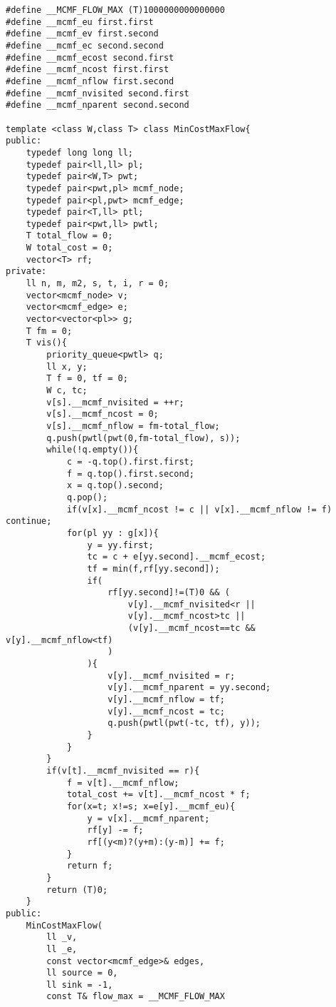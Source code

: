 \documentclass[a4paper,landscape,8pt]{extarticle}
\begin{document}
\begin{multicols}{3}
\begin{lstlisting}
#define __MCMF_FLOW_MAX (T)1000000000000000
#define __mcmf_eu first.first
#define __mcmf_ev first.second
#define __mcmf_ec second.second
#define __mcmf_ecost second.first
#define __mcmf_ncost first.first
#define __mcmf_nflow first.second
#define __mcmf_nvisited second.first
#define __mcmf_nparent second.second

template <class W,class T> class MinCostMaxFlow{
public:
    typedef long long ll;
    typedef pair<ll,ll> pl;
    typedef pair<W,T> pwt;
    typedef pair<pwt,pl> mcmf_node;
    typedef pair<pl,pwt> mcmf_edge;
    typedef pair<T,ll> ptl;
    typedef pair<pwt,ll> pwtl;
    T total_flow = 0;
    W total_cost = 0;
    vector<T> rf;
private:
    ll n, m, m2, s, t, i, r = 0;
    vector<mcmf_node> v;
    vector<mcmf_edge> e;
    vector<vector<pl>> g;
    T fm = 0;
    T vis(){
        priority_queue<pwtl> q;
        ll x, y;
        T f = 0, tf = 0;
        W c, tc;
        v[s].__mcmf_nvisited = ++r;
        v[s].__mcmf_ncost = 0;
        v[s].__mcmf_nflow = fm-total_flow;
        q.push(pwtl(pwt(0,fm-total_flow), s));
        while(!q.empty()){
            c = -q.top().first.first;
            f = q.top().first.second;
            x = q.top().second;
            q.pop();
            if(v[x].__mcmf_ncost != c || v[x].__mcmf_nflow != f) continue;
            for(pl yy : g[x]){
                y = yy.first;
                tc = c + e[yy.second].__mcmf_ecost;
                tf = min(f,rf[yy.second]);
                if(
                    rf[yy.second]!=(T)0 && (
                        v[y].__mcmf_nvisited<r ||
                        v[y].__mcmf_ncost>tc ||
                        (v[y].__mcmf_ncost==tc && v[y].__mcmf_nflow<tf)
                    )
                ){
                    v[y].__mcmf_nvisited = r;
                    v[y].__mcmf_nparent = yy.second;
                    v[y].__mcmf_nflow = tf;
                    v[y].__mcmf_ncost = tc;
                    q.push(pwtl(pwt(-tc, tf), y));
                }
            }
        }
        if(v[t].__mcmf_nvisited == r){
            f = v[t].__mcmf_nflow;
            total_cost += v[t].__mcmf_ncost * f;
            for(x=t; x!=s; x=e[y].__mcmf_eu){
                y = v[x].__mcmf_nparent;
                rf[y] -= f;
                rf[(y<m)?(y+m):(y-m)] += f;
            }
            return f;
        }
        return (T)0;
    }
public:
    MinCostMaxFlow(
        ll _v,
        ll _e,
        const vector<mcmf_edge>& edges,
        ll source = 0,
        ll sink = -1,
        const T& flow_max = __MCMF_FLOW_MAX

\end{lstlisting}
\end{multicols}
\end{document}

